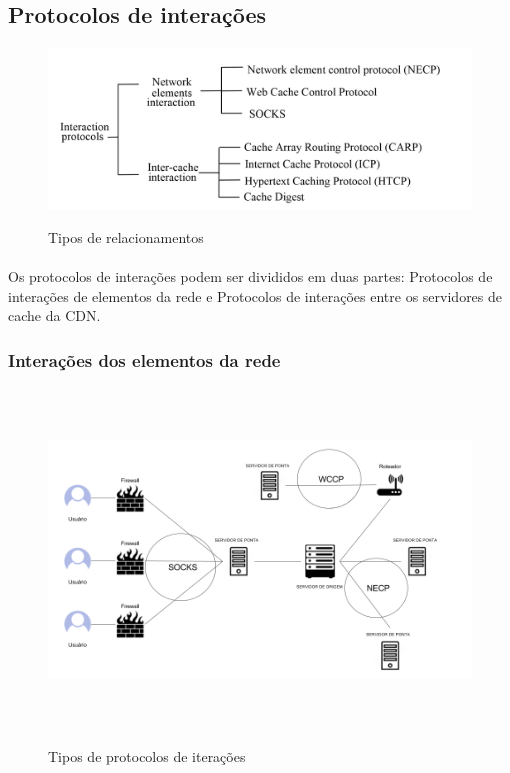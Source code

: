 \subsection{Protocolos de intera\c{c}\~oes}
\label{section:protocolos_interacoes}
\begin{figure}[H]
\caption{Tipos de relacionamentos}
\includegraphics[width=15cm]{Figuras/tipos_relacionamentos.png} 
\label{figura:tipos_relacionamentos}
\end{figure}

\paragraph{} Os protocolos de intera\c{c}\~oes podem ser divididos em duas partes: Protocolos de intera\c{c}\~oes de elementos da rede e Protocolos de intera\c{c}\~oes entre os servidores de cache da CDN. 


\subsubsection{Intera\c{c}\~oes dos elementos da rede}
\begin{figure}[H]
\caption{Tipos de protocolos de itera\c{c}\~oes}
\includegraphics[height=9cm]{Figuras/protocolos_interacao_elementos.png} 
\label{figura:protocolos_interacao_elementos}
\end{figure}

